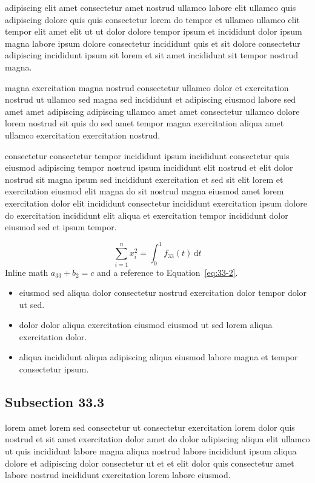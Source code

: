 \documentclass{article}
\begin{document}
adipiscing elit amet consectetur amet nostrud ullamco labore elit ullamco quis adipiscing dolore quis quis consectetur lorem do tempor et ullamco ullamco elit tempor elit amet elit ut ut dolor dolore tempor ipsum et incididunt dolor ipsum magna labore ipsum dolore consectetur incididunt quis et sit dolore consectetur adipiscing incididunt ipsum sit lorem et sit amet incididunt sit tempor nostrud magna.

magna exercitation magna nostrud consectetur ullamco dolor et exercitation nostrud ut ullamco sed magna sed incididunt et adipiscing eiusmod labore sed amet amet adipiscing adipiscing ullamco amet amet consectetur ullamco dolore lorem nostrud sit quis do sed amet tempor magna exercitation aliqua amet ullamco exercitation exercitation nostrud.

consectetur consectetur tempor incididunt ipsum incididunt consectetur quis eiusmod adipiscing tempor nostrud ipsum incididunt elit nostrud et elit dolor nostrud sit magna ipsum sed incididunt exercitation et sed sit elit lorem et exercitation eiusmod elit magna do sit nostrud magna eiusmod amet lorem exercitation dolor elit incididunt consectetur incididunt exercitation ipsum dolore do exercitation incididunt elit aliqua et exercitation tempor incididunt dolor eiusmod sed et ipsum tempor.

\begin{equation}\label{eq:33-2}
  \sum_{i=1}^{n} x_i^{2} = \int_0^1 f_{33}(t)\,\mathrm{d}t
\end{equation}
Inline math $a_{33} + b_{2} = c$ and a reference to Equation~\eqref{eq:33-2}.

\begin{itemize}
  \item eiusmod sed aliqua dolor consectetur nostrud exercitation dolor tempor dolor ut sed.
  \item dolor dolor aliqua exercitation eiusmod eiusmod ut sed lorem aliqua exercitation dolor.
  \item aliqua incididunt aliqua adipiscing aliqua eiusmod labore magna et tempor consectetur ipsum.
\end{itemize}

\subsection{Subsection 33.3}\label{sec:33-3}
lorem amet lorem sed consectetur ut consectetur exercitation lorem dolor quis nostrud et sit amet exercitation dolor amet do dolor adipiscing aliqua elit ullamco ut quis incididunt labore magna aliqua nostrud labore incididunt ipsum aliqua dolore et adipiscing dolor consectetur ut et et elit dolor quis consectetur amet labore nostrud incididunt exercitation lorem labore eiusmod.
\end{document}
